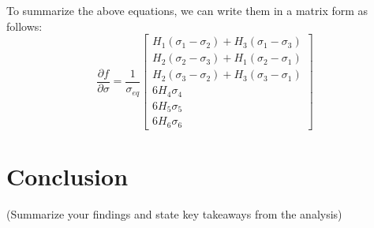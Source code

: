 \documentclass[12pt]{article}
\begin{document}
To summarize the above equations, we can write them in a matrix form as follows:
\begin{equation}
\frac{\partial{f}}{\partial{\sigma}} = \frac{1}{\sigma_{eq}}\begin{bmatrix}
H_{1}(\sigma_1-\sigma_2) + H_3(\sigma_1-\sigma_3) \\    
H_{2}(\sigma_2-\sigma_3) + H_1(\sigma_2-\sigma_1) \\
H_{2}(\sigma_3-\sigma_2) + H_3(\sigma_3-\sigma_1) \\
6H_{4}\sigma_4 \\
6H_{5}\sigma_5 \\
6H_{6}\sigma_6
\end{bmatrix}
\end{equation}




\section*{Conclusion}
(Summarize your findings and state key takeaways from the analysis)
\end{document}

